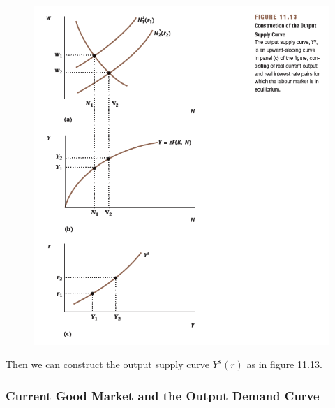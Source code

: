 \documentclass[11pt]{article}
\begin{document}
\begin{figure}[h]
\begin{minipage}{0.5\linewidth}
						\end{minipage}
						\hfill
						\begin{minipage}{0.5\linewidth}
							\centering
							\includegraphics[width=1.4\linewidth]{figures/1113}
						\end{minipage}
						
					\end{figure}
					
					\par Then we can construct the output supply curve $Y^s(r)$ as in figure 11.13.
					
				\newpage
				\subsubsection{Current Good Market and the Output Demand Curve}
\end{document}
